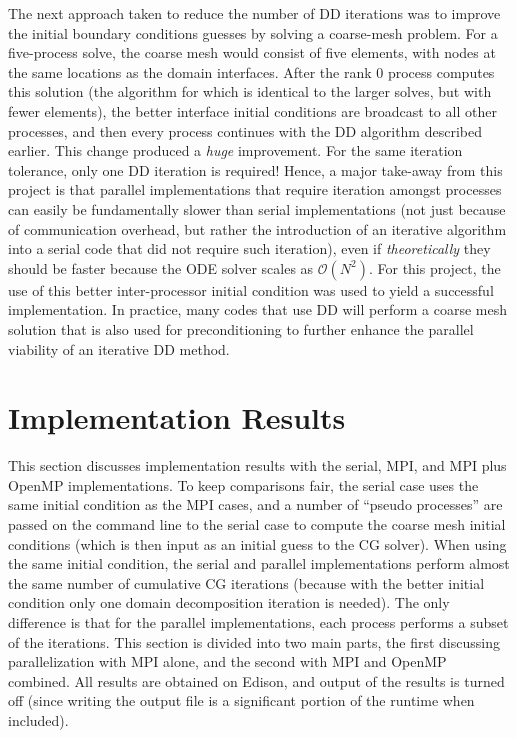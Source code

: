 \documentclass[10pt]{article}
\begin{document}
The next approach taken to reduce the number of DD iterations was to improve the initial boundary conditions guesses by solving a coarse-mesh problem. For a five-process solve, the coarse mesh would consist of five elements, with nodes at the same locations as the domain interfaces. After the rank 0 process computes this solution (the algorithm for which is identical to the larger solves, but with fewer elements), the better interface initial conditions are broadcast to all other processes, and then every process continues with the DD algorithm described earlier. This change produced a {\it huge} improvement. For the same iteration tolerance, only one DD iteration is required! Hence, a major take-away from this project is that parallel implementations that require iteration amongst processes can easily be fundamentally slower than serial implementations (not just because of communication overhead, but rather the introduction of an iterative algorithm into a serial code that did not require such iteration), even if {\it theoretically} they should be faster because the ODE solver scales as \(\mathscr{O}(N^2)\). For this project, the use of this better inter-processor initial condition was used to yield a successful implementation. In practice, many codes that use DD will perform a coarse mesh solution that is also used for preconditioning to further enhance the parallel viability of an iterative DD method.

\section{Implementation Results}
This section discusses implementation results with the serial, MPI, and MPI plus OpenMP implementations. To keep comparisons fair, the serial case uses the same initial condition as the MPI cases, and a number of ``pseudo processes'' are passed on the command line to the serial case to compute the coarse mesh initial conditions (which is then input as an initial guess to the CG solver). When using the same initial condition, the serial and parallel implementations perform almost the same number of cumulative CG iterations (because with the better initial condition only one domain decomposition iteration is needed). The only difference is that for the parallel implementations, each process performs a subset of the iterations. This section is divided into two main parts, the first discussing parallelization with MPI alone, and the second with MPI and OpenMP combined. All results are obtained on Edison, and output of the results is turned off (since writing the output file is a significant portion of the runtime when included).
\end{document}
